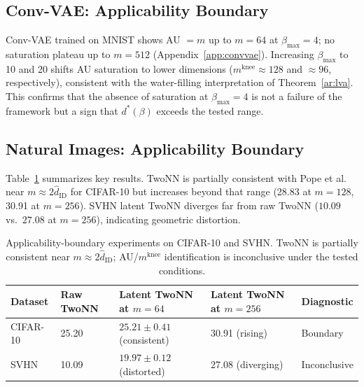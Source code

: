 \documentclass[make,article,submit,pdftex,moreauthors]{Definitions/mdpi}
\newcommand{\mknee}{m^{\mathrm{knee}}}
\newcommand{\hatdID}{\hat{d}_{\mathrm{ID}}}
\begin{document}
\subsection{Conv-VAE: Applicability Boundary}\label{sec:exp_conv}

Conv-VAE trained on MNIST shows AU $= m$ up to $m = 64$ at
$\beta_{\max} = 4$; no saturation plateau up to $m = 512$
(Appendix~\ref{app:convvae}).
Increasing $\beta_{\max}$ to 10 and 20 shifts AU saturation to lower
dimensions ($\mknee \approx 128$ and $\approx 96$, respectively), consistent
with the water-filling interpretation of Theorem~\ref{ar:lva}.
This confirms that the absence of saturation at $\beta_{\max} = 4$ is not a
failure of the framework but a sign that $d^*(\beta)$ exceeds the tested
range.

\subsection{Natural Images: Applicability Boundary}\label{sec:exp_natural}

Table~\ref{tab:natimg_summary} summarizes key results.
TwoNN is partially consistent with Pope et al.~\cite{pope2021intrinsic}
near $m \approx 2\hatdID$ for CIFAR-10 but increases beyond that range
(28.83 at $m = 128$, 30.91 at $m = 256$).
SVHN latent TwoNN diverges far from raw TwoNN ($10.09$ vs.\ $27.08$ at
$m = 256$), indicating geometric distortion.

\begin{table}[H]
\caption{Applicability-boundary experiments on CIFAR-10 and SVHN.
TwoNN is partially consistent near $m \approx 2\hatdID$;
AU/$\mknee$ identification is inconclusive under the tested conditions.
\label{tab:natimg_summary}}
\small
\begin{tabularx}{\textwidth}{lXXXX}
\toprule
\textbf{Dataset} & \textbf{Raw TwoNN} &
  \textbf{Latent TwoNN at $m = 64$} &
  \textbf{Latent TwoNN at $m = 256$} &
  \textbf{Diagnostic} \\
\midrule
CIFAR-10 & 25.20 & $25.21 \pm 0.41$ (consistent) &
  30.91 (rising) & Boundary \\
SVHN & 10.09 & $19.97 \pm 0.12$ (distorted) &
  27.08 (diverging) & Inconclusive \\
\bottomrule
\end{tabularx}
\end{table}
\end{document}
